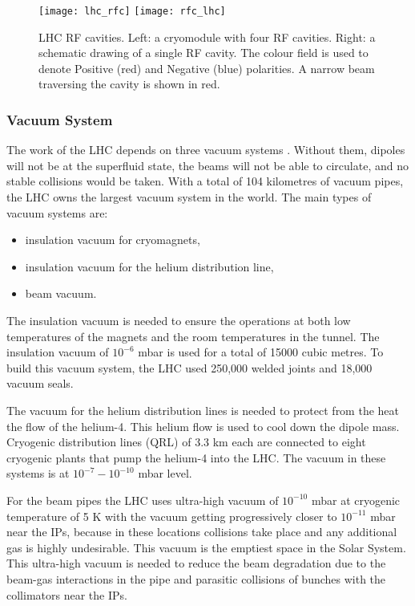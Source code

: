 \begin{figure}[H]
\centering
\texttt{[image: lhc\_rfc]}
\texttt{[image: rfc\_lhc]}
\caption[RF cavities module.]{LHC RF cavities. Left: a cryomodule with four RF cavities. Right: a schematic drawing of a single RF cavity. The colour field is used to denote Positive (red) and Negative (blue) polarities. A narrow beam traversing the cavity is shown in red. }
\label{lhc_rfc}
\end{figure}




\subsubsection{Vacuum System}\label{sec:vacuum}



The work of the LHC depends on three vacuum systems \cite{LHC_vacuum}. Without them, dipoles will not be at the superfluid state, the beams will not be able to circulate, and no stable collisions would be taken. With a total of 104 kilometres of vacuum pipes, the LHC owns the largest vacuum system in the world. The main types of vacuum systems are:

\begin{itemize}
\item insulation vacuum for cryomagnets,
\item insulation vacuum for the helium distribution line,
\item beam vacuum.
\end{itemize}


The insulation vacuum is needed to ensure the operations at both low temperatures of the magnets and the room temperatures in the tunnel. The insulation vacuum of $10^{-6}$ mbar is used for a total of 15000 cubic metres. To build this vacuum system, the LHC used 250,000 welded joints and 18,000 vacuum seals. 


The vacuum for the helium distribution lines is needed to protect from the heat the flow of the helium-4. This helium flow is used to cool down the dipole mass. Cryogenic distribution lines (QRL) of 3.3 km each are connected to eight cryogenic plants that pump the helium-4 into the LHC. The vacuum in these systems is at $10^{-7}-10^{-10}$ mbar level. 



For the beam pipes the LHC uses ultra-high vacuum of $10^{-10}$ mbar at cryogenic temperature of 5 K with the vacuum getting progressively closer to $10^{-11}$ mbar near the IPs, because in these locations collisions take place and any additional gas is highly undesirable. This vacuum is the emptiest space in the Solar System. This ultra-high vacuum is needed to reduce the beam degradation due to the beam-gas interactions in the pipe and parasitic collisions of bunches with the collimators near the IPs. 

